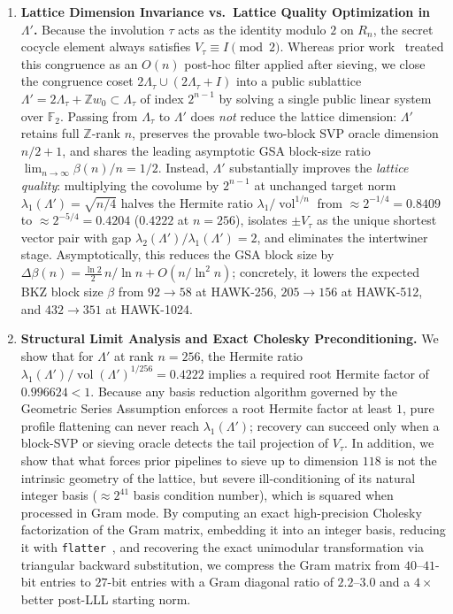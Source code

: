 \documentclass[11pt,a4paper]{article}
\theoremstyle{definition}
\newcommand{\Z}{\mathbb{Z}}
\newcommand{\F}{\mathbb{F}}
\newcommand{\Lt}{\Lambda_\tau}
\newcommand{\Lp}{\Lambda'}
\newcommand{\Vt}{V_\tau}
\newcommand{\vol}{\operatorname{vol}}
\begin{document}
\begin{enumerate}[leftmargin=*]
\item \textbf{Lattice Dimension Invariance vs.\ Lattice Quality Optimization in $\Lp$.}
Because the involution $\tau$ acts as the identity modulo $2$ on $R_n$, the secret cocycle element always satisfies $\Vt \equiv I \pmod 2$. Whereas prior work~\cite{SW26} treated this congruence as an $O(n)$ post-hoc filter applied after sieving, we close the congruence coset $2\Lt \cup (2\Lt + I)$ into a public sublattice $\Lp = 2\Lt + \Z w_0 \subset \Lt$ of index $2^{n-1}$ by solving a single public linear system over $\F_2$. Passing from $\Lt$ to $\Lp$ does \emph{not} reduce the lattice dimension: $\Lp$ retains full $\Z$-rank $n$, preserves the provable two-block SVP oracle dimension $n/2+1$, and shares the leading asymptotic GSA block-size ratio $\lim_{n\to\infty}\beta(n)/n = 1/2$. Instead, $\Lp$ substantially improves the \emph{lattice quality}: multiplying the covolume by $2^{n-1}$ at unchanged target norm $\lambda_1(\Lp) = \sqrt{n/4}$ halves the Hermite ratio $\lambda_1/\vol^{1/n}$ from $\approx 2^{-1/4} = 0.8409$ to $\approx 2^{-5/4} = 0.4204$ ($0.4222$ at $n=256$), isolates $\pm\Vt$ as the unique shortest vector pair with gap $\lambda_2(\Lp)/\lambda_1(\Lp) = 2$, and eliminates the intertwiner stage. Asymptotically, this reduces the GSA block size by $\Delta\beta(n) = \frac{\ln 2}{2}\,n/\ln n + O(n/\ln^2 n)$; concretely, it lowers the expected BKZ block size $\beta$ from $92\to 58$ at HAWK-256, $205\to 156$ at HAWK-512, and $432\to 351$ at HAWK-1024.

\item \textbf{Structural Limit Analysis and Exact Cholesky Preconditioning.}
We show that for $\Lp$ at rank $n=256$, the Hermite ratio $\lambda_1(\Lp)/\vol(\Lp)^{1/256} = 0.4222$ implies a required root Hermite factor of $0.996624 < 1$. Because any basis reduction algorithm governed by the Geometric Series Assumption enforces a root Hermite factor at least $1$, pure profile flattening can never reach $\lambda_1(\Lp)$; recovery can succeed only when a block-SVP or sieving oracle detects the tail projection of $\Vt$. In addition, we show that what forces prior pipelines to sieve up to dimension $118$ is not the intrinsic geometry of the lattice, but severe ill-conditioning of its natural integer basis ($\approx 2^{41}$ basis condition number), which is squared when processed in Gram mode. By computing an exact high-precision Cholesky factorization of the Gram matrix, embedding it into an integer basis, reducing it with \texttt{flatter}~\cite{RH23}, and recovering the exact unimodular transformation via triangular backward substitution, we compress the Gram matrix from $40$--$41$-bit entries to $27$-bit entries with a Gram diagonal ratio of $2.2$--$3.0$ and a $4\times$ better post-LLL starting norm.


\end{enumerate}
\end{document}
